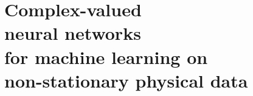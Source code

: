 \chapter[Complex-valued neural networks for machine learning on non-stationary physical data]{Complex-valued\\neural networks\\for machine learning on\\\hspace*{-2cm}non-stationary physical data}


{\vfill\hfill\newline{}}

